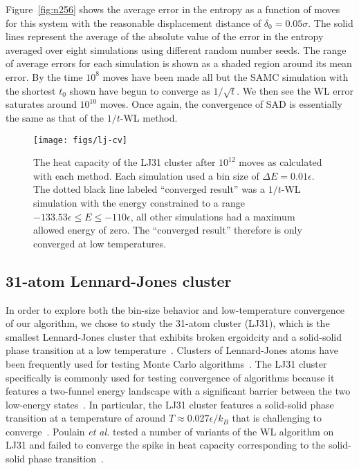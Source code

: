 \documentclass[letterpaper,twocolumn,amsmath,amssymb,pre,aps,10pt]{revtex4-1}
\begin{document}
Figure~\ref{fig:n256} shows the average error in the entropy as a
function of moves for this system with the reasonable displacement
distance of $\delta_0 = 0.05\sigma$.  The solid lines represent the
average of the absolute value of the error in the entropy averaged
over eight simulations using different random number seeds.  The range
of average errors for each simulation is shown as a shaded region
around its mean error.  By the time $10^8$ moves have been made all
but the SAMC simulation with the shortest $t_0$ shown have begun to
converge as $1/\sqrt{t}$.  We then see the WL error saturates around
$10^{10}$ moves.  Once again, the convergence of SAD is essentially
the same as that of the $1/t$-WL method.

\begin{figure}
  \texttt{[image: figs/lj-cv]}
  \caption{The heat capacity of the LJ31 cluster after $10^{12}$ moves
    as calculated with each method.  Each simulation used a bin size
    of $\Delta E=0.01\epsilon$.  The dotted black line labeled
    ``converged result'' was a $1/t$-WL simulation with the energy
    constrained to a range $-133.53\epsilon\le E\le -110\epsilon$,
    all other simulations had a maximum allowed energy of zero.  The
    ``converged result'' therefore is only converged at low temperatures.}
  \label{fig:lj-cv}
\end{figure}

\subsection{31-atom Lennard-Jones cluster}

In order to explore both the bin-size behavior and low-temperature
convergence of our algorithm, we chose to study the 31-atom cluster
(LJ31), which is the smallest Lennard-Jones cluster that exhibits
broken ergoidcity and a solid-solid phase transition at a low
temperature~\cite{doye1998thermodynamics,
  martiniani2014superposition}.  Clusters of Lennard-Jones atoms have
been frequently used for testing Monte Carlo
algorithms~\cite{wales1997global, neirotti2000phase,
  frantsuzov2005size, mandelshtam2006multiple}.  The LJ31 cluster
specifically is commonly used for testing convergence of algorithms
because it features a two-funnel energy landscape with a significant
barrier between the two low-energy states~\cite{calvo2000entropic,
  calvo2000phase, poulain2006performances,
  martiniani2014superposition}.  In particular, the LJ31 cluster
features a solid-solid phase transition at a temperature of around $T
\approx 0.027\epsilon/k_B$ that is challenging to
converge~\cite{mandelshtam2006multiple}.  Poulain \emph{et al.}
tested a number of variants of the WL algorithm on LJ31 and failed to
converge the spike in heat capacity corresponding to the solid-solid
phase transition~\cite{poulain2006performances}.
\end{document}

